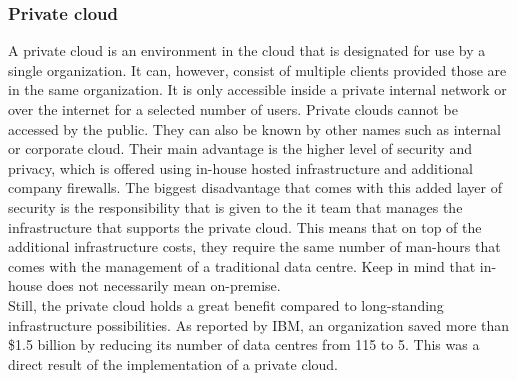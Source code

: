 \subsubsection{Private cloud}
A private cloud is an environment in the cloud that is designated for use by a single organization. 
It can, however, consist of multiple clients provided those are in the same organization. 
It is only accessible inside a private internal network or over the internet for a selected number of users. 
Private clouds cannot be accessed by the public. 
They can also be known by other names such as internal or corporate cloud. 
Their main advantage is the higher level of security and privacy, which is offered using in-house hosted infrastructure and additional company firewalls. 
The biggest disadvantage that comes with this added layer of security is the responsibility that is given to the \acrshort{it} team that manages the infrastructure that supports the private cloud. 
This means that on top of the additional infrastructure costs, they require the same number of man-hours that comes with the management of a traditional data centre. 
Keep in mind that in-house does not necessarily mean on-premise.
\\
Still, the private cloud holds a great benefit compared to long-standing infrastructure possibilities. 
As reported by IBM, an organization saved more than \$1.5 billion by reducing its number of data centres from 115 to 5. 
This was a direct result of the implementation of a private cloud. \autocite{Hofmann2010} 


